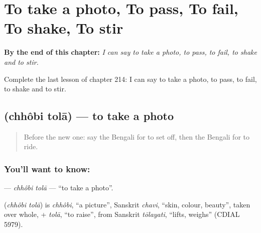
\chapter{To take a photo, To pass, To fail, To shake, To stir}
\label{ch:bn-to-take-a-photo-to-pass-to-fail-to-shake-to-stir}

\begin{chapteropening}
\textbf{By the end of this chapter:} \emph{I can say to take a photo, to pass, to fail, to shake and to stir.}

Complete the last lesson of chapter 214: I can say to take a photo, to pass, to fail, to shake and to stir.
\end{chapteropening}

\section[\texorpdfstring{\bn{ছবি} \bn{তোলা} (chhôbi tolā)}{ছবি তোলা (chhôbi tolā)}]{  (chhôbi tolā) — to take a photo}

\label{lesson:BN-C214-chhobi-tola}



\begin{quote}
Before the new one: say the Bengali for to set off, then the Bengali for to ride.
\end{quote}

\subsection*{You'll want to know:  }
\textbf{ } — \emph{chhôbi tolā} — \textquotedblleft{}to take a photo\textquotedblright{}.

\begin{cousinweb}
\textbf{ } (\emph{chhôbi tolā}) is \emph{chhôbi}, \textquotedblleft{}a picture\textquotedblright{}, Sanskrit \emph{chavi}, \textquotedblleft{}skin, colour, beauty\textquotedblright{}, taken over whole, + \emph{tolā}, \textquotedblleft{}to raise\textquotedblright{}, from Sanskrit \emph{tōlayati}, \textquotedblleft{}lifts, weighs\textquotedblright{} (CDIAL 5979).
\end{cousinweb}

